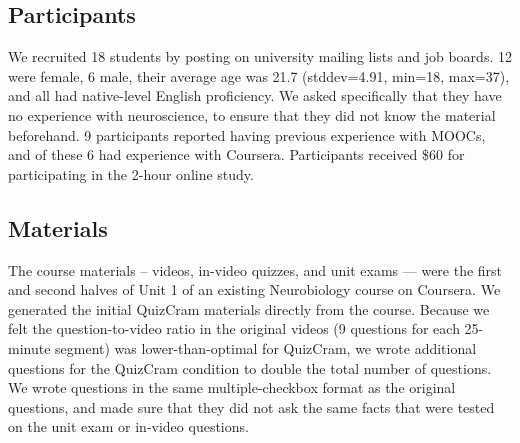 \documentclass{chi-ext}
\begin{document}
\subsection{Participants}

We recruited 18  students by posting on university mailing lists and job boards. 12 were female, 6 male, their average age was 21.7 (stddev=4.91, min=18, max=37), and all had native-level English proficiency. We asked specifically that they have no experience with neuroscience, to ensure that they did not know the material beforehand.  9 participants reported having previous experience with MOOCs, and of these 6 had experience with Coursera. Participants received \$60 for participating in the 2-hour online study.

\subsection{Materials}



The course materials -- videos, in-video quizzes, and unit exams --- were the first and second halves of Unit 1 of an existing Neurobiology course on Coursera. We generated the initial QuizCram materials directly from the course. Because we felt the question-to-video ratio in the original videos (9 questions for each 25-minute segment) was lower-than-optimal for QuizCram, we wrote additional questions for the QuizCram condition to double the total number of questions. We wrote questions in the same multiple-checkbox format as the original questions, and made sure that they did not ask the same facts that were tested on the unit exam or in-video questions.
\end{document}
